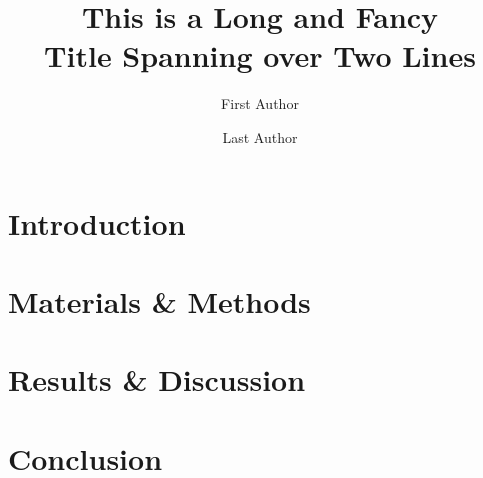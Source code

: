 \documentclass[a0paper]{mhh-poster}
\title{This is a Long and Fancy \\
       Title Spanning over Two Lines}
\author[1]{First Author}
\author[1]{Last Author}
\affil[1]{Department of \LaTeX, Hannover Medical School, Hannover, Germany}
\institute{Institution}
\begin{document}
\begin{multicols}{2}


\section{Introduction}
\lipsum[1]
\cite{stallman99:telepolis}


\section{Materials \& Methods}
\lipsum[2]


\section{Results \& Discussion}
\lipsum[2]


\section{Conclusion}
\lipsum[1]


\printbibliography

\end{multicols}
\end{document}
